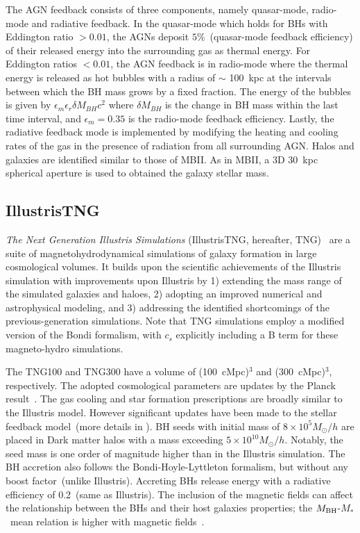 \documentclass[twocolumn]{aastex631}
\def\smass{{$M_*$}}
\def\mbh{$M_{\rm BH}$}
\begin{document}
The AGN feedback consists of three components, namely quasar-mode, radio-mode and radiative feedback. In the quasar-mode which holds for BHs with Eddington ratio $>0.01$, the AGNs deposit $5\%$~(quasar-mode feedback efficiency) of their released energy into the surrounding gas as thermal energy. For Eddington ratios $<0.01$, the AGN feedback is in radio-mode where the thermal energy is released as hot bubbles with a radius of $\sim$ 100~kpc at the intervals between which the BH mass grows by a fixed fraction. 
The energy of the bubbles is given by $\epsilon_m \epsilon_r \delta M_{BH} c^2$ where $\delta M_{BH}$ is the change in BH mass within the last time interval, and $\epsilon_m=0.35$ is the radio-mode feedback efficiency. Lastly, the radiative feedback mode is implemented by modifying the heating and cooling rates of the gas in the presence of radiation from all surrounding AGN. Halos and galaxies are identified similar to those of MBII. As in MBII, a 3D 30~kpc spherical aperture is used to obtained the galaxy stellar mass. %


\subsection{IllustrisTNG}
{\it The Next Generation Illustris Simulations} (IllustrisTNG, hereafter, TNG)~\citep{2018MNRAS.475..676S, Pillepich2018, Naiman2018, Marinacci2018, Nelson2018} are a suite of magnetohydrodynamical simulations of galaxy formation in large cosmological volumes. It builds upon the scientific achievements of the Illustris simulation with improvements upon Illustris by 1) extending the mass range of the simulated galaxies and haloes, 2) adopting an improved numerical and astrophysical modeling, and 3) addressing the identified shortcomings of the previous-generation simulations. Note that TNG simulations employ a modified version of the Bondi formalism, with $c_s$ explicitly including a B term for these magneto-hydro simulations.

The TNG100 and TNG300 have a volume of (100~cMpc)$^3$ and (300~cMpc)$^3$, respectively. The adopted cosmological parameters are updates by the Planck result~\citep{2016A&A...594A..13P}.
The gas cooling and star formation prescriptions are broadly similar to the Illustris model. However significant updates have been made to the stellar feedback model~(more details in \citealt{2018MNRAS.473.4077P}).
BH seeds with initial mass of $8 \times 10^5 M_{\odot}/h$ are placed in Dark matter halos with a mass exceeding $5 \times 10^{10} M_{\odot}/h$. Notably, the seed mass is one order of magnitude higher than in the Illustris simulation. The BH accretion also follows the Bondi-Hoyle-Lyttleton formalism, but without any boost factor~(unlike Illustris). Accreting BHs release energy with a radiative efficiency of 0.2~(same as Illustris). The inclusion of the magnetic fields can affect the relationship between the BHs and their host galaxies properties; the \mbh-\smass\ mean relation is higher with magnetic fields~\citep{2018MNRAS.473.4077P}. 
\end{document}
